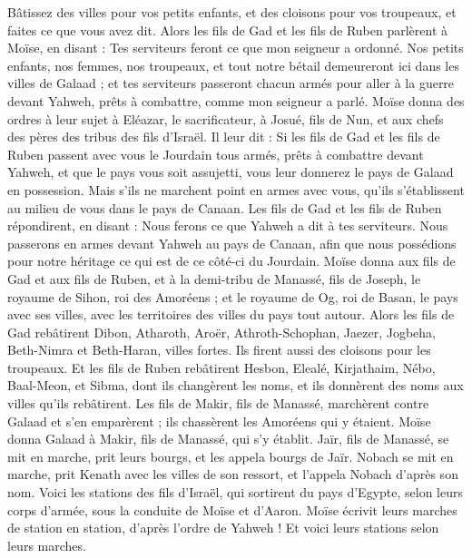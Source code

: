 \begin{multicols}{2}
Bâtissez des villes pour vos petits enfants, et des cloisons pour vos troupeaux, et faites ce que vous avez dit.
Alors les fils de Gad et les fils de Ruben parlèrent à Moïse, en disant : Tes serviteurs feront ce que mon seigneur a ordonné.
Nos petits enfants, nos femmes, nos troupeaux, et tout notre bétail demeureront ici dans les villes de Galaad ;
et tes serviteurs passeront chacun armés pour aller à la guerre devant Yahweh, prêts à combattre, comme mon seigneur a parlé.
Moïse donna des ordres à leur sujet à Eléazar, le sacrificateur, à Josué, fils de Nun, et aux chefs des pères des tribus des fils d'Israël.
Il leur dit : Si les fils de Gad et les fils de Ruben passent avec vous le Jourdain tous armés, prêts à combattre devant Yahweh, et que le pays vous soit assujetti, vous leur donnerez le pays de Galaad en possession.
Mais s'ils ne marchent point en armes avec vous, qu’ils s’établissent au milieu de vous dans le pays de Canaan.
Les fils de Gad et les fils de Ruben répondirent, en disant : Nous ferons ce que Yahweh a dit à tes serviteurs.
Nous passerons en armes devant Yahweh au pays de Canaan, afin que nous possédions pour notre héritage ce qui est de ce côté-ci du Jourdain.
Moïse donna aux fils de Gad et aux fils de Ruben, et à la demi-tribu de Manassé, fils de Joseph, le royaume de Sihon, roi des Amoréens ; et le royaume de Og, roi de Basan, le pays avec ses villes, avec les territoires des villes du pays tout autour.
Alors les fils de Gad rebâtirent Dibon, Atharoth, Aroër,
Athroth-Schophan, Jaezer, Jogbeha,
Beth-Nimra et Beth-Haran, villes fortes. Ils firent aussi des cloisons pour les troupeaux.
Et les fils de Ruben rebâtirent Hesbon, Elealé, Kirjathaim,
Nébo, Baal-Meon, et Sibma, dont ils changèrent les noms, et ils donnèrent des noms aux villes qu'ils rebâtirent.
Les fils de Makir, fils de Manassé, marchèrent contre Galaad et s’en emparèrent ; ils chassèrent les Amoréens qui y étaient.
Moïse donna Galaad à Makir, fils de Manassé, qui s’y établit.
Jaïr, fils de Manassé, se mit en marche, prit leurs bourgs, et les appela bourgs de Jaïr.
Nobach se mit en marche, prit Kenath avec les villes de son ressort, et l'appela Nobach d’après son nom.
\VerseOne{}Voici les stations des fils d'Israël, qui sortirent du pays d'Egypte, selon leurs corps d’armée, sous la conduite de Moïse et d'Aaron.
Moïse écrivit leurs marches de station en station, d’après l’ordre de Yahweh ! Et voici leurs stations selon leurs marches.

\end{multicols}
